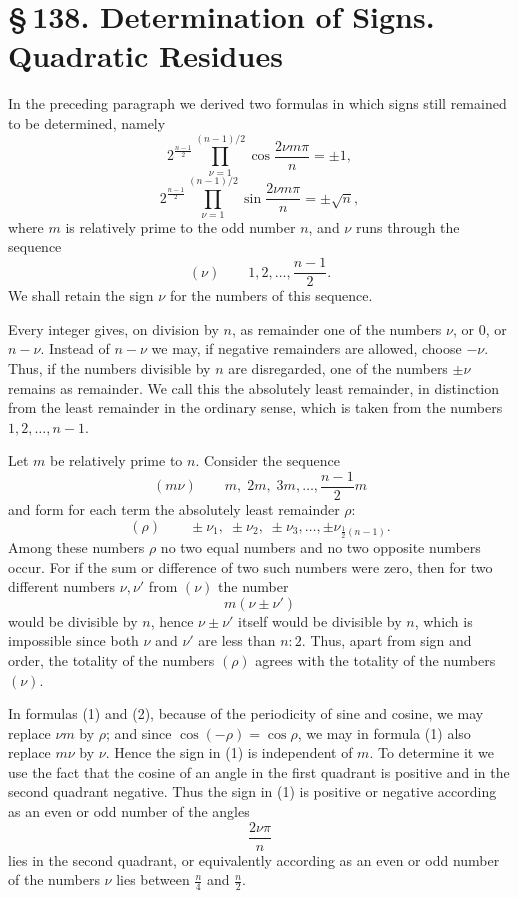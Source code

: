 \documentclass[11pt]{article}
\providecommand{\sect}[2]{\section*{\S\,#1. #2}}
\begin{document}
\sect{138}{Determination of Signs. Quadratic Residues}

In the preceding paragraph we derived two formulas in which signs still remained to be determined, namely
\[
\tag{1}
2^{\frac{n-1}{2}}\prod_{\nu=1}^{(n-1)/2}\cos\frac{2\nu m\pi}{n}=\pm1,
\]
\[
\tag{2}
2^{\frac{n-1}{2}}\prod_{\nu=1}^{(n-1)/2}\sin\frac{2\nu m\pi}{n}=\pm\sqrt n,
\]
where $m$ is relatively prime to the odd number $n$, and $\nu$ runs through the sequence
\[
(\nu)\qquad 1,2,\ldots,\frac{n-1}{2}.
\]
We shall retain the sign $\nu$ for the numbers of this sequence.

Every integer gives, on division by $n$, as remainder one of the numbers $\nu$, or $0$, or $n-\nu$. Instead of $n-\nu$ we may, if negative remainders are allowed, choose $-\nu$. Thus, if the numbers divisible by $n$ are disregarded, one of the numbers $\pm\nu$ remains as remainder. We call this the absolutely least remainder, in distinction from the least remainder in the ordinary sense, which is taken from the numbers $1,2,\ldots,n-1$.

Let $m$ be relatively prime to $n$. Consider the sequence
\[
(m\nu)\qquad m,\;2m,\;3m,\ldots,\frac{n-1}{2}m
\]
and form for each term the absolutely least remainder $\rho$:
\[
(\rho)\qquad \pm\nu_1,\;\pm\nu_2,\;\pm\nu_3,\ldots,
       \pm\nu_{\frac12(n-1)}.
\]
Among these numbers $\rho$ no two equal numbers and no two opposite numbers occur. For if the sum or difference of two such numbers were zero, then for two different numbers $\nu,\nu'$ from $(\nu)$ the number
\[
        m(\nu\pm\nu')
\]
would be divisible by $n$, hence $\nu\pm\nu'$ itself would be divisible by $n$, which is impossible since both $\nu$ and $\nu'$ are less than $n:2$. Thus, apart from sign and order, the totality of the numbers $(\rho)$ agrees with the totality of the numbers $(\nu)$.

In formulas (1) and (2), because of the periodicity of sine and cosine, we may replace $\nu m$ by $\rho$; and since $\cos(-\rho)=\cos\rho$, we may in formula (1) also replace $m\nu$ by $\nu$. Hence the sign in (1) is independent of $m$. To determine it we use the fact that the cosine of an angle in the first quadrant is positive and in the second quadrant negative. Thus the sign in (1) is positive or negative according as an even or odd number of the angles
\[
        \frac{2\nu\pi}{n}
\]
lies in the second quadrant, or equivalently according as an even or odd number of the numbers $\nu$ lies between $\frac n4$ and $\frac n2$.
\end{document}
